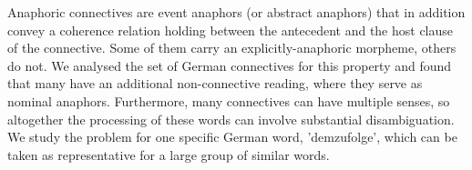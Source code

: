 Anaphoric connectives are event anaphors (or abstract anaphors) that in addition convey a coherence relation holding between the antecedent and the host clause of the connective. Some of them carry an explicitly-anaphoric morpheme, others do not. We analysed the set of German connectives for this property and found that many have an additional non-connective reading, where they serve as nominal anaphors. Furthermore, many connectives can have multiple senses, so altogether the processing of these words can involve substantial disambiguation. We study the problem for one specific German word, 'demzufolge', which can be taken as representative for a large group of similar words.
